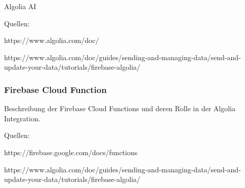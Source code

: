 Algolia AI

Quellen:

https://www.algolia.com/doc/

https://www.algolia.com/doc/guides/sending-and-managing-data/send-and-update-your-data/tutorials/firebase-algolia/

\subsubsection{Firebase Cloud Function}

Beschreibung der Firebase Cloud Functions und deren Rolle in der Algolia Integration.

Quellen:

https://firebase.google.com/docs/functions

https://www.algolia.com/doc/guides/sending-and-managing-data/send-and-update-your-data/tutorials/firebase-algolia/
